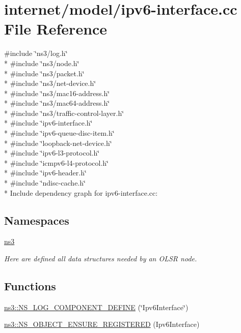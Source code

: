\hypertarget{ipv6-interface_8cc}{}\section{internet/model/ipv6-\/interface.cc File Reference}
\label{ipv6-interface_8cc}
{\ttfamily \#include \char`\"{}ns3/log.\+h\char`\"{}}\\*
{\ttfamily \#include \char`\"{}ns3/node.\+h\char`\"{}}\\*
{\ttfamily \#include \char`\"{}ns3/packet.\+h\char`\"{}}\\*
{\ttfamily \#include \char`\"{}ns3/net-\/device.\+h\char`\"{}}\\*
{\ttfamily \#include \char`\"{}ns3/mac16-\/address.\+h\char`\"{}}\\*
{\ttfamily \#include \char`\"{}ns3/mac64-\/address.\+h\char`\"{}}\\*
{\ttfamily \#include \char`\"{}ns3/traffic-\/control-\/layer.\+h\char`\"{}}\\*
{\ttfamily \#include \char`\"{}ipv6-\/interface.\+h\char`\"{}}\\*
{\ttfamily \#include \char`\"{}ipv6-\/queue-\/disc-\/item.\+h\char`\"{}}\\*
{\ttfamily \#include \char`\"{}loopback-\/net-\/device.\+h\char`\"{}}\\*
{\ttfamily \#include \char`\"{}ipv6-\/l3-\/protocol.\+h\char`\"{}}\\*
{\ttfamily \#include \char`\"{}icmpv6-\/l4-\/protocol.\+h\char`\"{}}\\*
{\ttfamily \#include \char`\"{}ipv6-\/header.\+h\char`\"{}}\\*
{\ttfamily \#include \char`\"{}ndisc-\/cache.\+h\char`\"{}}\\*
Include dependency graph for ipv6-\/interface.cc\+:
\subsection*{Namespaces}
\begin{DoxyCompactItemize}
\item 
 \hyperlink{namespacens3}{ns3}
\begin{DoxyCompactList}\small\item\em Here are defined all data structures needed by an O\+L\+SR node. \end{DoxyCompactList}\end{DoxyCompactItemize}
\subsection*{Functions}
\begin{DoxyCompactItemize}
\item 
\hyperlink{namespacens3_ac9bf7f4dc168ba52ec3df7fa3e7fdc22}{ns3\+::\+N\+S\+\_\+\+L\+O\+G\+\_\+\+C\+O\+M\+P\+O\+N\+E\+N\+T\+\_\+\+D\+E\+F\+I\+NE} (\char`\"{}Ipv6\+Interface\char`\"{})
\item 
\hyperlink{namespacens3_a7c446cc9e954c5322e39cfd8a8325c43}{ns3\+::\+N\+S\+\_\+\+O\+B\+J\+E\+C\+T\+\_\+\+E\+N\+S\+U\+R\+E\+\_\+\+R\+E\+G\+I\+S\+T\+E\+R\+ED} (Ipv6\+Interface)
\end{DoxyCompactItemize}
